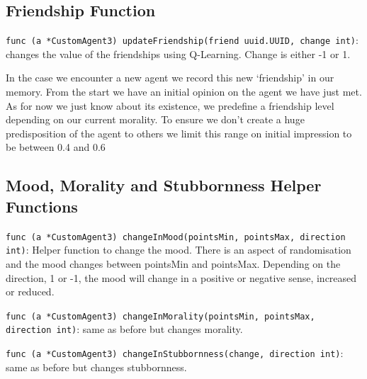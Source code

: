 \subsection{Friendship Function}
\begin{sloppypar} %
\texttt{func (a *CustomAgent3) updateFriendship(friend uuid.UUID, change int)}: changes the value of the friendships using Q-Learning. Change is either -1 or 1. \par
\end{sloppypar}
In the case we encounter a new agent we record this new ‘friendship’ in our memory. From the start we have an initial opinion on the agent we have just met. As for now we just know about its existence, we predefine a friendship level depending on our current morality. To ensure we don’t create a huge predisposition of the agent to others we limit this range on initial impression to be between 0.4 and 0.6

\subsection{Mood, Morality and Stubbornness Helper Functions }
\texttt{func (a *CustomAgent3) changeInMood(pointsMin, pointsMax, direction int)}: Helper function to change the mood. There is an aspect of randomisation and the mood changes between pointsMin and pointsMax. Depending on the direction, 1 or -1, the mood will change in a positive or negative sense, increased or reduced. \par
\begin{sloppypar} %
\texttt{func (a *CustomAgent3) changeInMorality(pointsMin, pointsMax, direction int)}: same as before but changes morality. \par
\end{sloppypar}
\texttt{func (a *CustomAgent3) changeInStubbornness(change, direction int)}: same as before but changes stubbornness. \par


